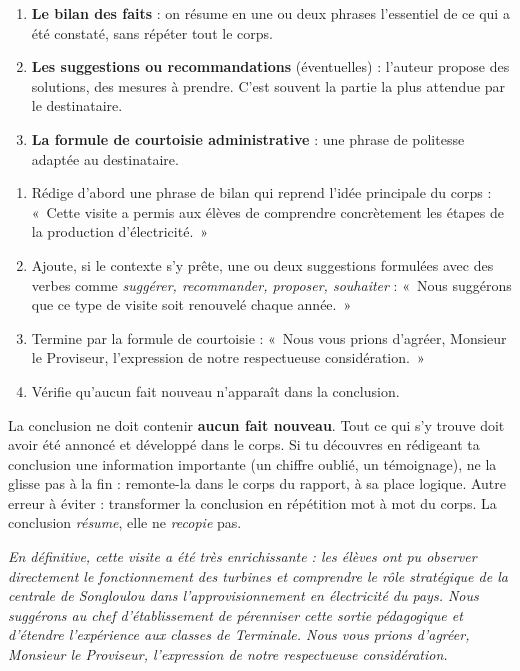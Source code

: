 \documentclass[11pt]{article}
\begin{document}
\begin{enumerate}
\item \textbf{Le bilan des faits} : on résume en une ou deux phrases l'essentiel de ce qui a été constaté, sans répéter tout le corps.
\item \textbf{Les suggestions ou recommandations} (éventuelles) : l'auteur propose des solutions, des mesures à prendre. C'est souvent la partie la plus attendue par le destinataire.
\item \textbf{La formule de courtoisie administrative} : une phrase de politesse adaptée au destinataire.
\end{enumerate}

\begin{methode}
\begin{enumerate}
\item Rédige d'abord une phrase de bilan qui reprend l'idée principale du corps : «~Cette visite a permis aux élèves de comprendre concrètement les étapes de la production d'électricité.~»
\item Ajoute, si le contexte s'y prête, une ou deux suggestions formulées avec des verbes comme \emph{suggérer, recommander, proposer, souhaiter} : «~Nous suggérons que ce type de visite soit renouvelé chaque année.~»
\item Termine par la formule de courtoisie : «~Nous vous prions d'agréer, Monsieur le Proviseur, l'expression de notre respectueuse considération.~»
\item Vérifie qu'aucun fait nouveau n'apparaît dans la conclusion.
\end{enumerate}
\end{methode}

\begin{attention}
La conclusion ne doit contenir \textbf{aucun fait nouveau}. Tout ce qui s'y trouve doit avoir été annoncé et développé dans le corps. Si tu découvres en rédigeant ta conclusion une information importante (un chiffre oublié, un témoignage), ne la glisse pas à la fin : remonte-la dans le corps du rapport, à sa place logique. Autre erreur à éviter : transformer la conclusion en répétition mot à mot du corps. La conclusion \emph{résume}, elle ne \emph{recopie} pas.
\end{attention}

\begin{exemplebox}
\emph{En définitive, cette visite a été très enrichissante : les élèves ont pu observer directement le fonctionnement des turbines et comprendre le rôle stratégique de la centrale de Songloulou dans l'approvisionnement en électricité du pays. Nous suggérons au chef d'établissement de pérenniser cette sortie pédagogique et d'étendre l'expérience aux classes de Terminale. Nous vous prions d'agréer, Monsieur le Proviseur, l'expression de notre respectueuse considération.}
\end{exemplebox}
\end{document}
